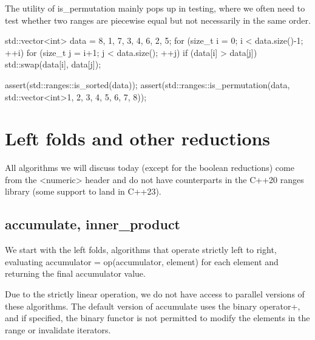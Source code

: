 

The utility of is\_permutation mainly pops up in testing, where we often need to test whether two ranges are piecewise equal but not necessarily in the same order.

\begin{box-note}
\begin{cppcode}
std::vector<int> data = { 8, 1, 7, 3, 4, 6, 2, 5};
for (size_t i = 0; i < data.size()-1; ++i)
    for (size_t j = i+1; j < data.size(); ++j)
        if (data[i] > data[j])
            std::swap(data[i], data[j]);

assert(std::ranges::is_sorted(data));
assert(std::ranges::is_permutation(data, 
                                   std::vector<int>{1, 2, 3, 4, 5, 6, 7, 8}));
\end{cppcode}
\end{box-note}

\section{Left folds and other reductions}

All algorithms we will discuss today (except for the boolean reductions) come from the <numeric> header and do not have counterparts in the C++20 ranges library (some support to land in C++23).

\subsection{accumulate, inner\_product}

We start with the left folds, algorithms that operate strictly left to right, evaluating accumulator = op(accumulator, element) for each element and returning the final accumulator value.



Due to the strictly linear operation, we do not have access to parallel versions of these algorithms. The default version of accumulate uses the binary operator+, and if specified, the binary functor is not permitted to modify the elements in the range or invalidate iterators.

